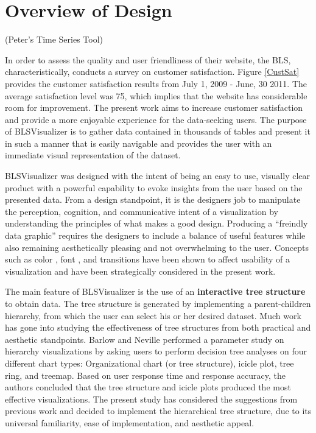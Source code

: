 \documentclass[journal]{IEEEtran}
\newcommand\Peter[1]{{\color{red}#1}}	%
\begin{document}
\Peter{\section{Overview of Design}}

(Peter's Time Series Tool)

\Peter{In order to assess the quality and user friendliness of their website, the BLS, characteristically, conducts a survey on customer satisfaction. Figure \ref{CustSat} provides the customer satisfaction results from July 1, 2009 - June, 30 2011. The average satisfaction level was 75, which implies that the website has considerable room for improvement. The present work aims to increase customer satisfaction and provide a more enjoyable experience for the data-seeking users. The purpose of BLSVisualizer is to gather data contained in thousands of tables and present it in such a manner that is easily navigable and provides the user with an immediate visual representation of the dataset. 

BLSVisualizer was designed with the intent of being an easy to use, visually clear product with a powerful capability to evoke insights from the user based on the presented data. From a design standpoint, it is the designers job to manipulate the perception, cognition, and communicative intent of a visualization \cite{Agrawala2011} by understanding the principles of what makes a good design. Producing a ``freindly data graphic'' \cite{Tufte} requires the designers to include a balance of useful features while also remaining aesthetically pleasing and not overwhelming to the user. Concepts such as color \cite{MacDonald1999}, font \cite{Moere2011}, and transitions \cite{Heer2007} have been shown to affect usability of a visualization and have been strategically considered in the present work. 

The main feature of BLSVisualizer is the use of an \textbf{interactive tree structure} to obtain data. The tree structure is generated by implementing a parent-children hierarchy, from which the user can select his or her desired dataset. Much work has gone into studying the effectiveness of tree structures from both practical \cite{Barlow2001} and aesthetic \cite{Wetherell1979, Reingold1981} standpoints. Barlow and Neville performed a parameter study on hierarchy visualizations by asking users to perform decision tree analyses on four different chart types: Organizational chart (or tree structure), icicle plot, tree ring, and treemap. Based on user response time and response accuracy, the authors concluded that the tree structure and icicle plots produced the most effective visualizations. The present study has considered the suggestions from previous work and decided to implement the hierarchical tree structure, due to its universal familiarity, ease of implementation, and aesthetic appeal. 

}
\end{document}
